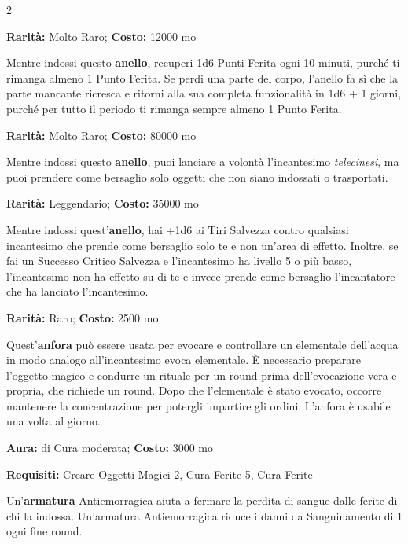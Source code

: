 \begin{multicols}{2}
\medskip


\textbf{Rarità:} Molto Raro; \textbf{Costo:} 12000 mo

Mentre indossi questo \textbf{anello}, recuperi 1d6 Punti Ferita ogni 10 minuti, purché ti rimanga almeno 1 Punto Ferita. Se perdi una parte del corpo, l'anello fa sì che la parte mancante ricresca e ritorni alla sua completa funzionalità in 1d6 + 1 giorni, purché per tutto il periodo ti rimanga sempre almeno 1 Punto Ferita.


\textbf{Rarità:} Molto Raro; \textbf{Costo:} 80000 mo

Mentre indossi questo \textbf{anello}, puoi lanciare a volontà l'incantesimo \emph{telecinesi}, ma puoi prendere come bersaglio solo oggetti che non siano indossati o trasportati.


\textbf{Rarità:} Leggendario; \textbf{Costo:} 35000 mo

Mentre indossi quest'\textbf{anello}, hai +1d6 ai Tiri Salvezza contro qualsiasi incantesimo che prende come bersaglio solo te e non un'area di effetto. Inoltre, se fai un Successo Critico Salvezza e l'incantesimo ha livello 5 o più basso, l'incantesimo non ha effetto su di te e invece prende come bersaglio l'incantatore che ha lanciato l'incantesimo.


\textbf{Rarità:} Raro; \textbf{Costo:} 2500 mo

Quest'\textbf{anfora} può essere usata per evocare e controllare un elementale dell'acqua in modo analogo all'incantesimo evoca elementale. È necessario preparare l'oggetto magico e condurre un rituale per un round prima dell'evocazione vera e propria, che richiede un round. Dopo che l'elementale è stato evocato, occorre mantenere la concentrazione per potergli impartire gli ordini. L'anfora è usabile una volta al giorno.


\textbf{Aura:} di Cura moderata; \textbf{Costo:} 3000 mo

\textbf{Requisiti:} Creare Oggetti Magici 2, Cura Ferite 5, Cura Ferite

Un'\textbf{armatura} Antiemorragica aiuta a fermare la perdita di sangue dalle ferite di chi la indossa. Un'armatura Antiemorragica riduce i danni da Sanguinamento di 1 ogni fine round.


\end{multicols}
